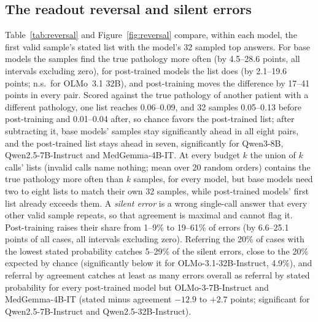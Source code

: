 \documentclass[11pt]{article}
\begin{document}
\subsection{The readout reversal and silent errors}\label{sec:reversal}
Table~\ref{tab:reversal} and Figure~\ref{fig:reversal} compare, within each model, the first valid sample's stated list with the model's 32 sampled top answers. For base models the samples find the true pathology more often (by 4.5--28.6 points, all intervals excluding zero), for post-trained models the list does (by 2.1--19.6 points; n.s.\ for OLMo~3.1 32B), and post-training moves the difference by 17--41 points in every pair. Scored against the true pathology of another patient with a different pathology, one list reaches 0.06--0.09, and 32 samples 0.05--0.13 before post-training and 0.01--0.04 after, so chance favors the post-trained list; after subtracting it, base models' samples stay significantly ahead in all eight pairs, and the post-trained list stays ahead in seven, significantly for Qwen3-8B, Qwen2.5-7B-Instruct and MedGemma-4B-IT. At every budget $k$ the union of $k$ calls' lists (invalid calls name nothing; mean over 20 random orders) contains the true pathology more often than $k$ samples, for every model, but base models need two to eight lists to match their own 32 samples, while post-trained models' first list already exceeds them. A \emph{silent error} is a wrong single-call answer that every other valid sample repeats, so that agreement is maximal and cannot flag it. Post-training raises their share from 1--9\% to 19--61\% of errors (by 6.6--25.1 points of all cases, all intervals excluding zero). Referring the 20\% of cases with the lowest stated probability catches 5--29\% of the silent errors, close to the 20\% expected by chance (significantly below it for OLMo-3.1-32B-Instruct, 4.9\%), and referral by agreement catches at least as many errors overall as referral by stated probability for every post-trained model but OLMo-3-7B-Instruct and MedGemma-4B-IT (stated minus agreement $-12.9$ to $+2.7$ points; significant for Qwen2.5-7B-Instruct and Qwen2.5-32B-Instruct).
\end{document}
